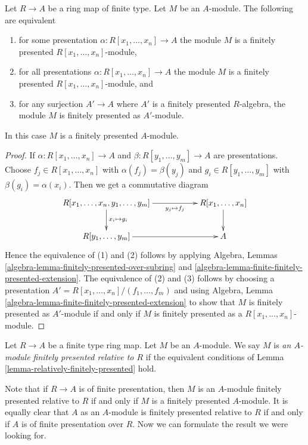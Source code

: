 \begin{lemma}
\label{lemma-relatively-finitely-presented}
Let $R \to A$ be a ring map of finite type.
Let $M$ be an $A$-module.
The following are equivalent
\begin{enumerate}
\item for some presentation $\alpha : R[x_1, \ldots, x_n] \to A$
the module $M$ is a finitely presented $R[x_1, \ldots, x_n]$-module,
\item for all presentations $\alpha : R[x_1, \ldots, x_n] \to A$
the module $M$ is a finitely presented $R[x_1, \ldots, x_n]$-module, and
\item for any surjection $A' \to A$ where $A'$ is a finitely presented
$R$-algebra, the module $M$ is finitely presented as $A'$-module.
\end{enumerate}
In this case $M$ is a finitely presented $A$-module.
\end{lemma}

\begin{proof}
If $\alpha : R[x_1, \ldots, x_n] \to A$ and
$\beta : R[y_1, \ldots, y_m] \to A$ are presentations.
Choose $f_j \in R[x_1, \ldots, x_n]$ with $\alpha(f_j) = \beta(y_j)$
and $g_i \in R[y_1, \ldots, y_m]$ with $\beta(g_i) = \alpha(x_i)$.
Then we get a commutative diagram
$$
\xymatrix{
R[x_1, \ldots, x_n, y_1, \ldots, y_m]
\ar[d]^{x_i \mapsto g_i} \ar[rr]_-{y_j \mapsto f_j} & &
R[x_1, \ldots, x_n] \ar[d] \\
R[y_1, \ldots, y_m] \ar[rr] & & A
}
$$
Hence the equivalence of (1) and (2) follows by applying
Algebra, Lemmas \ref{algebra-lemma-finitely-presented-over-subring} and
\ref{algebra-lemma-finite-finitely-presented-extension}.
The equivalence of (2) and (3) follows by choosing a presentation
$A' = R[x_1, \ldots, x_n]/(f_1, \ldots, f_m)$ and using
Algebra, Lemma \ref{algebra-lemma-finite-finitely-presented-extension}
to show that $M$ is finitely presented as $A'$-module if and only if
$M$ is finitely presented as a $R[x_1, \ldots, x_n]$-module.
\end{proof}

\begin{definition}
\label{definition-relatively-finitely-presented}
Let $R \to A$ be a finite type ring map. Let $M$ be an $A$-module.
We say $M$ is {\it an $A$-module finitely presented relative to $R$}
if the equivalent conditions of
Lemma \ref{lemma-relatively-finitely-presented}
hold.
\end{definition}

\noindent
Note that if $R \to A$ is of finite presentation, then $M$ is an
$A$-module finitely presented relative to $R$ if and only if $M$
is a finitely presented $A$-module. It is equally clear that $A$ as
an $A$-module is finitely presented relative to $R$ if and only if
$A$ is of finite presentation over $R$.
Now we can formulate the result we were looking for.

